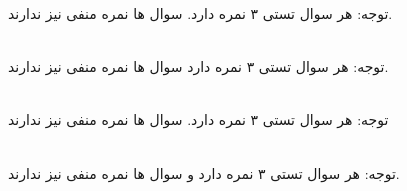 \documentclass[a4paper,12pt,openany,oneside]{article}
\begin{document}
\newcommand{\correct}{\checkmark}
\newcommand{\questionCount}{30}
\newcommand{\qNumA}{1}
\newcommand{\qNumB}{2}
\newcommand{\qNumC}{3}
\newcommand{\qNumD}{4}
\newcommand{\quest}{\renewcommand{\qestionType}{op1}\noindent\stepcounter{quesCounter}\thequesCounter)\ }
\newcommand{\questEnd}{\ \\[4ex]}

\newcommand{\questName}{ques1}
\newcommand{\qestionType}{op1}




\newpage
توجه: هر سوال تستی ۳ نمره دارد. سوال ها نمره منفی نیز ندارند.\\


\ \newpage\ \newpage 

\renewcommand{\qNumA}{3}
\renewcommand{\qNumB}{1}
\renewcommand{\qNumC}{2}
\renewcommand{\qNumD}{4}
\setcounter{quesCounter}{0}
\setcounter{page}{1}

\newpage
توجه: هر سوال تستی ۳ نمره دارد  سوال ها نمره منفی نیز ندارند.\\


\ \newpage\ \newpage 

\renewcommand{\qNumA}{2}
\renewcommand{\qNumB}{3}
\renewcommand{\qNumC}{1}
\renewcommand{\qNumD}{4}
\setcounter{quesCounter}{0}
\setcounter{page}{1}

\newpage
توجه: هر سوال تستی ۳ نمره دارد. سوال ها نمره منفی نیز ندارند\\


\ \newpage\ \newpage 

\renewcommand{\qNumA}{3}
\renewcommand{\qNumB}{2}
\renewcommand{\qNumC}{1}
\renewcommand{\qNumD}{4}
\setcounter{quesCounter}{0}
\setcounter{page}{1}

\newpage
توجه: هر سوال تستی ۳ نمره دارد و سوال ها نمره منفی نیز ندارند.\\


\ \newpage\ \newpage 
\end{document}
